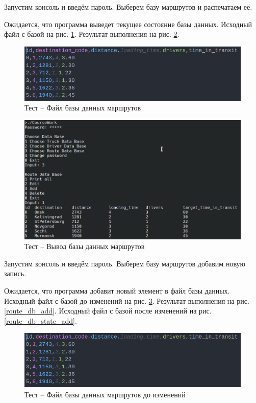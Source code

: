 
Запустим консоль и введём пароль. 
Выберем базу маршрутов и распечатаем её.

Ожидается, что программа выведет текущее состояние базы данных.
Исходный файл с базой на рис. \ref{route_db_state_init}.
Результат выполнения на рис. \ref{route_db_print}.

\begin{figure}[H]
	\centering
	\includegraphics[width=0.7\linewidth]{photo/tests/admin/route_db_state_init}
	\caption{Тест -- Файл базы данных маршрутов}
	\label{route_db_state_init}
\end{figure}

\begin{figure}[H]
	\centering
	\includegraphics[width=0.7\linewidth]{photo/tests/admin/route_db_print}
	\caption{Тест -- Вывод базы данных маршрутов}
	\label{route_db_print}
\end{figure}

Запустим консоль и введём пароль. 
Выберем базу маршрутов добавим новую запись.

Ожидается, что программа добавит новый элемент в файл базы данных.
Исходный файл с базой до изменений на рис. \ref{route_db_state_init2}.
Результат выполнения на рис. \ref{route_db_add}.
Исходный файл с базой после изменений на рис. \ref{route_db_state_add}.

\begin{figure}[H]
	\centering
	\includegraphics[width=0.7\linewidth]{photo/tests/admin/route_db_state_init}
	\caption{Тест -- Файл базы данных маршрутов до изменений}
	\label{route_db_state_init2}
\end{figure}

